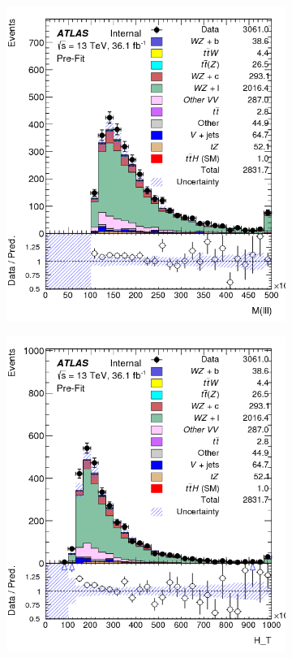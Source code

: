 \documentclass[NOTE, atlasdraft=true, texlive=2016, UKenglish]{\ATLASLATEXPATH atlasdoc}
\begin{document}
\begin{figure}[H]
    \begin{subfigure}{.48\textwidth}
        \includegraphics[width=1\linewidth]{m3l.png}
        \caption{}
        \label{fig:m3l}
    \end{subfigure}%
    \begin{subfigure}{.48\textwidth}
        \includegraphics[width=1\linewidth]{HT.png}

\end{subfigure}
\end{figure}
\end{document}
